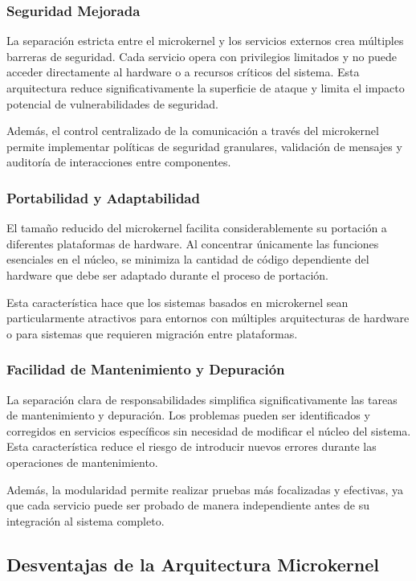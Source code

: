 \documentclass[12pt,a4paper]{article}
\begin{document}
\subsubsection{Seguridad Mejorada}

La separación estricta entre el microkernel y los servicios externos crea múltiples barreras de seguridad. Cada servicio opera con privilegios limitados y no puede acceder directamente al hardware o a recursos críticos del sistema. Esta arquitectura reduce significativamente la superficie de ataque y limita el impacto potencial de vulnerabilidades de seguridad.

Además, el control centralizado de la comunicación a través del microkernel permite implementar políticas de seguridad granulares, validación de mensajes y auditoría de interacciones entre componentes.

\subsubsection{Portabilidad y Adaptabilidad}

El tamaño reducido del microkernel facilita considerablemente su portación a diferentes plataformas de hardware. Al concentrar únicamente las funciones esenciales en el núcleo, se minimiza la cantidad de código dependiente del hardware que debe ser adaptado durante el proceso de portación.

Esta característica hace que los sistemas basados en microkernel sean particularmente atractivos para entornos con múltiples arquitecturas de hardware o para sistemas que requieren migración entre plataformas.

\subsubsection{Facilidad de Mantenimiento y Depuración}

La separación clara de responsabilidades simplifica significativamente las tareas de mantenimiento y depuración. Los problemas pueden ser identificados y corregidos en servicios específicos sin necesidad de modificar el núcleo del sistema. Esta característica reduce el riesgo de introducir nuevos errores durante las operaciones de mantenimiento.

Además, la modularidad permite realizar pruebas más focalizadas y efectivas, ya que cada servicio puede ser probado de manera independiente antes de su integración al sistema completo.

\subsection{Desventajas de la Arquitectura Microkernel}
\end{document}
